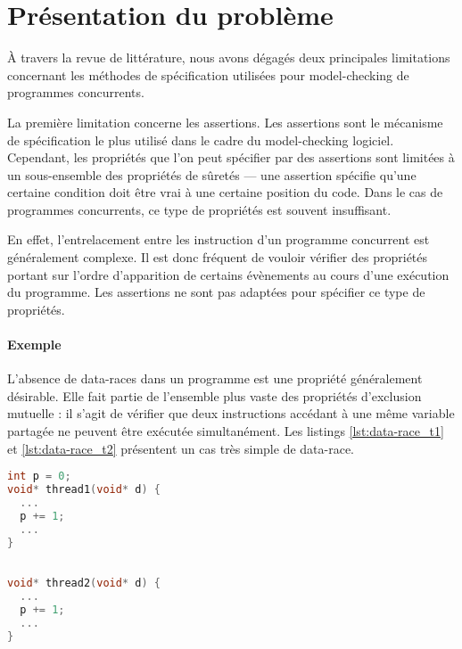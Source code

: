 \label{sec:Theme1}

\section{Présentation du problème}

À travers la revue de littérature, nous avons dégagés deux principales
limitations concernant les méthodes de spécification utilisées pour
model-checking de programmes concurrents.

La première limitation concerne les assertions. Les assertions sont le mécanisme
de spécification le plus utilisé dans le cadre du model-checking logiciel.
Cependant, les propriétés que l'on peut spécifier par des assertions sont
limitées à un sous-ensemble des propriétés de sûretés --- une assertion spécifie
qu'une certaine condition doit être vrai à une certaine position du code. Dans
le cas de programmes concurrents, ce type de propriétés est souvent insuffisant.

En effet, l'entrelacement entre les instruction d'un programme concurrent est
généralement complexe. Il est donc fréquent de vouloir vérifier des propriétés
portant sur l'ordre d'apparition de certains évènements au cours d'une exécution
du programme. Les assertions ne sont pas adaptées pour spécifier ce type de
propriétés.

\paragraph{Exemple}
L'absence de data-races dans un programme est une propriété
généralement désirable. Elle fait partie de l'ensemble plus vaste des propriétés
d'exclusion mutuelle : il s'agit de vérifier que deux instructions accédant à
une même variable partagée ne peuvent être exécutée simultanément. Les listings
\ref{lst:data-race_t1} et \ref{lst:data-race_t2} présentent un cas très simple
de data-race.

\noindent\begin{minipage}{.45\textwidth}
  \begin{lstlisting}[language=C, frame=single, caption=Thread 1,
    label=lst:data-race_t1]
int p = 0;
void* thread1(void* d) {
  ...
  p += 1;
  ...
}
\end{lstlisting}
\end{minipage}\hfill
\begin{minipage}{.45\textwidth}
\begin{lstlisting}[language=C, frame=single, caption=Thread 2,
    label=lst:data-race_t2]

void* thread2(void* d) {
  ...
  p += 1;
  ...
}
\end{lstlisting}
\end{minipage}

